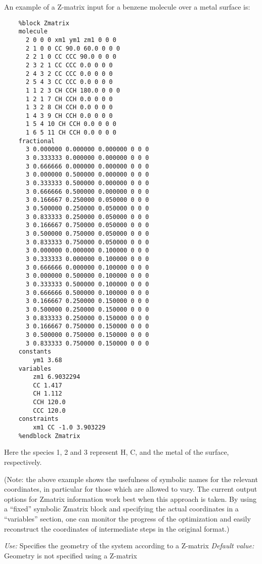 \begin{description}
An example of a Z-matrix input for a benzene molecule over a metal surface is:
\begin{verbatim}
    %block Zmatrix
    molecule
      2 0 0 0 xm1 ym1 zm1 0 0 0
      2 1 0 0 CC 90.0 60.0 0 0 0
      2 2 1 0 CC CCC 90.0 0 0 0
      2 3 2 1 CC CCC 0.0 0 0 0
      2 4 3 2 CC CCC 0.0 0 0 0
      2 5 4 3 CC CCC 0.0 0 0 0
      1 1 2 3 CH CCH 180.0 0 0 0
      1 2 1 7 CH CCH 0.0 0 0 0
      1 3 2 8 CH CCH 0.0 0 0 0
      1 4 3 9 CH CCH 0.0 0 0 0
      1 5 4 10 CH CCH 0.0 0 0 0
      1 6 5 11 CH CCH 0.0 0 0 0
    fractional
      3 0.000000 0.000000 0.000000 0 0 0
      3 0.333333 0.000000 0.000000 0 0 0
      3 0.666666 0.000000 0.000000 0 0 0
      3 0.000000 0.500000 0.000000 0 0 0
      3 0.333333 0.500000 0.000000 0 0 0
      3 0.666666 0.500000 0.000000 0 0 0
      3 0.166667 0.250000 0.050000 0 0 0
      3 0.500000 0.250000 0.050000 0 0 0
      3 0.833333 0.250000 0.050000 0 0 0
      3 0.166667 0.750000 0.050000 0 0 0
      3 0.500000 0.750000 0.050000 0 0 0
      3 0.833333 0.750000 0.050000 0 0 0
      3 0.000000 0.000000 0.100000 0 0 0
      3 0.333333 0.000000 0.100000 0 0 0
      3 0.666666 0.000000 0.100000 0 0 0
      3 0.000000 0.500000 0.100000 0 0 0
      3 0.333333 0.500000 0.100000 0 0 0
      3 0.666666 0.500000 0.100000 0 0 0
      3 0.166667 0.250000 0.150000 0 0 0
      3 0.500000 0.250000 0.150000 0 0 0
      3 0.833333 0.250000 0.150000 0 0 0
      3 0.166667 0.750000 0.150000 0 0 0
      3 0.500000 0.750000 0.150000 0 0 0
      3 0.833333 0.750000 0.150000 0 0 0
    constants
        ym1 3.68
    variables
        zm1 6.9032294
        CC 1.417
        CH 1.112
        CCH 120.0
        CCC 120.0
    constraints
        xm1 CC -1.0 3.903229
    %endblock Zmatrix
\end{verbatim}

Here the species 1, 2 and 3 represent H, C, and the metal of the
surface, respectively.

(Note: the above example shows the usefulness of symbolic names
for the relevant coordinates, in particular for those which are
allowed to vary. The current output options for Zmatrix information
work best when this approach is taken. By using a ``fixed'' symbolic
Zmatrix block and specifying the actual coordinates in a ``variables''
section, one can monitor the progress of the optimization and
easily reconstruct the coordinates of intermediate steps in the
original format.)

\textit{Use:} Specifies the geometry of the system according to a Z-matrix
\textit{Default value:} Geometry is not specified using a Z-matrix


\end{description}
